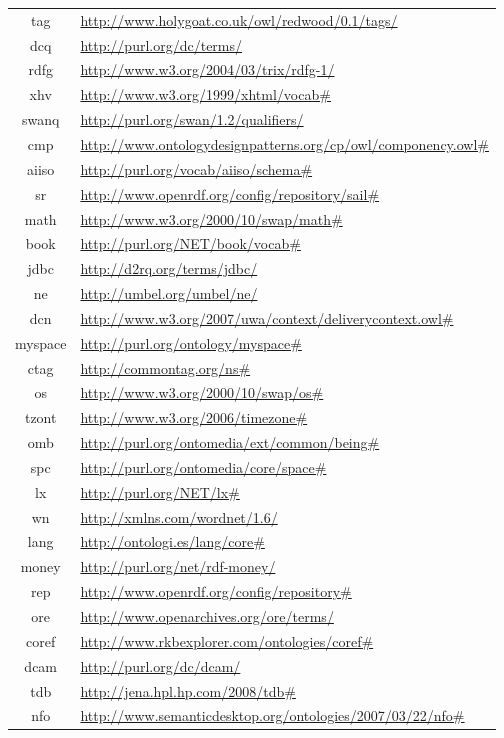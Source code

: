 \documentclass{article}
\begin{document}
\begin{longtable}{ c | p{8cm} }
tag & \url{http://www.holygoat.co.uk/owl/redwood/0.1/tags/} \\
dcq & \url{http://purl.org/dc/terms/} \\
rdfg & \url{http://www.w3.org/2004/03/trix/rdfg-1/} \\
xhv & \url{http://www.w3.org/1999/xhtml/vocab#} \\
swanq & \url{http://purl.org/swan/1.2/qualifiers/} \\
cmp & \url{http://www.ontologydesignpatterns.org/cp/owl/componency.owl#} \\
aiiso & \url{http://purl.org/vocab/aiiso/schema#} \\
sr & \url{http://www.openrdf.org/config/repository/sail#} \\
math & \url{http://www.w3.org/2000/10/swap/math#} \\
book & \url{http://purl.org/NET/book/vocab#} \\
jdbc & \url{http://d2rq.org/terms/jdbc/} \\
ne & \url{http://umbel.org/umbel/ne/} \\
dcn & \url{http://www.w3.org/2007/uwa/context/deliverycontext.owl#} \\
myspace & \url{http://purl.org/ontology/myspace#} \\
ctag & \url{http://commontag.org/ns#} \\
os & \url{http://www.w3.org/2000/10/swap/os#} \\
tzont & \url{http://www.w3.org/2006/timezone#} \\
omb & \url{http://purl.org/ontomedia/ext/common/being#} \\
spc & \url{http://purl.org/ontomedia/core/space#} \\
lx & \url{http://purl.org/NET/lx#} \\
wn & \url{http://xmlns.com/wordnet/1.6/} \\
lang & \url{http://ontologi.es/lang/core#} \\
money & \url{http://purl.org/net/rdf-money/} \\
rep & \url{http://www.openrdf.org/config/repository#} \\
ore & \url{http://www.openarchives.org/ore/terms/} \\
coref & \url{http://www.rkbexplorer.com/ontologies/coref#} \\
dcam & \url{http://purl.org/dc/dcam/} \\
tdb & \url{http://jena.hpl.hp.com/2008/tdb#} \\
nfo & \url{http://www.semanticdesktop.org/ontologies/2007/03/22/nfo#} \\

\end{longtable}
\end{document}
